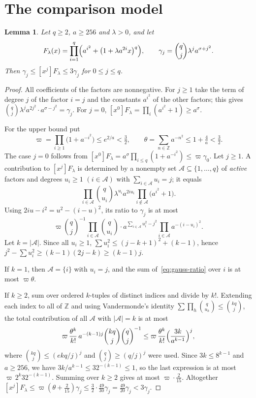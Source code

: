 \documentclass[11pt]{amsart}
\newtheorem{lemma}[theorem]{Lemma}
\theoremstyle{definition}
\theoremstyle{remark}
\numberwithin{equation}{section}
\newcommand{\cA}{\mathcal{A}}
\newcommand{\coef}[2]{[x^{#1}]#2}
\begin{document}
\section{The comparison model}\label{sec:gauss}

\begin{lemma}\label{lem:gauss}
Let $q\ge2$, $a\ge256$ and $\lambda>0$, and let
\[
F_\lambda(x)=\prod_{i=1}^q\Bigl(a^{i^2}+\bigl(1+\lambda a^{2i}x\bigr)^q\Bigr),\qquad\gamma_j=\binom qj\lambda^ja^{\sigma+j^2}.
\]
Then $\gamma_j\le\coef{j}{F_\lambda}\le3\gamma_j$ for $0\le j\le q$.
\end{lemma}

\begin{proof}
All coefficients of the factors are nonnegative. For $j\ge1$ take the term of degree $j$ of the factor $i=j$ and the constants $a^{i^2}$ of the other factors; this gives $\binom qj\lambda^ja^{2j^2}\cdot a^{\sigma-j^2}=\gamma_j$. For $j=0$, $\coef0{F_\lambda}=\prod_i(a^{i^2}+1)\ge a^\sigma$.

For the upper bound put
\[
\varpi=\prod_{i\ge1}\bigl(1+a^{-i^2}\bigr)\le e^{2/a}<\tfrac32,\qquad\theta=\sum_{n\in\mathbb Z}a^{-n^2}\le1+\tfrac4a<\tfrac32.
\]
The case $j=0$ follows from $\coef0{F_\lambda}=a^\sigma\prod_{i\le q}(1+a^{-i^2})\le\varpi\gamma_0$. Let $j\ge1$. A contribution to $\coef j{F_\lambda}$ is determined by a nonempty set $\cA\subseteq\{1,\dots,q\}$ of \emph{active} factors and degrees $u_i\ge1$ $(i\in\cA)$ with $\sum_{i\in\cA}u_i=j$; it equals
\[
\prod_{i\in\cA}\binom q{u_i}\lambda^{u_i}a^{2iu_i}\prod_{i\notin\cA}\bigl(a^{i^2}+1\bigr).
\]
Using $2iu-i^2=u^2-(i-u)^2$, its ratio to $\gamma_j$ is at most
\begin{equation}\label{eq:gauss-ratio}
\varpi\binom qj^{-1}\prod_{i\in\cA}\binom q{u_i}\cdot a^{\sum_{i\in\cA}u_i^2-j^2}\prod_{i\in\cA}a^{-(i-u_i)^2}.
\end{equation}
Let $k=|\cA|$. Since all $u_i\ge1$, $\sum u_i^2\le(j-k+1)^2+(k-1)$, hence $j^2-\sum u_i^2\ge(k-1)(2j-k)\ge(k-1)j$.

If $k=1$, then $\cA=\{i\}$ with $u_i=j$, and the sum of~\eqref{eq:gauss-ratio} over $i$ is at most $\varpi\theta$.

If $k\ge2$, sum over ordered $k$-tuples of distinct indices and divide by $k!$. Extending each index to all of $\mathbb Z$ and using Vandermonde's identity $\sum\prod_h\binom q{u_h}\le\binom{kq}j$, the total contribution of all $\cA$ with $|\cA|=k$ is at most
\[
\varpi\,\frac{\theta^k}{k!}\,a^{-(k-1)j}\binom{kq}j\binom qj^{-1}\le\varpi\,\frac{\theta^k}{k!}\Bigl(\frac{3k}{a^{k-1}}\Bigr)^j,
\]
where $\binom{kq}j\le(ekq/j)^j$ and $\binom qj\ge(q/j)^j$ were used. Since $3k\le8^{k-1}$ and $a\ge256$, we have $3k/a^{k-1}\le32^{-(k-1)}\le1$, so the last expression is at most $\varpi\,2^k32^{-(k-1)}$. Summing over $k\ge2$ gives at most $\varpi\cdot\frac2{15}$. Altogether $\coef j{F_\lambda}\le\varpi(\theta+\tfrac2{15})\gamma_j\le\tfrac32\cdot\tfrac{49}{30}\gamma_j=\tfrac{49}{20}\gamma_j<3\gamma_j$.
\end{proof}
\end{document}
